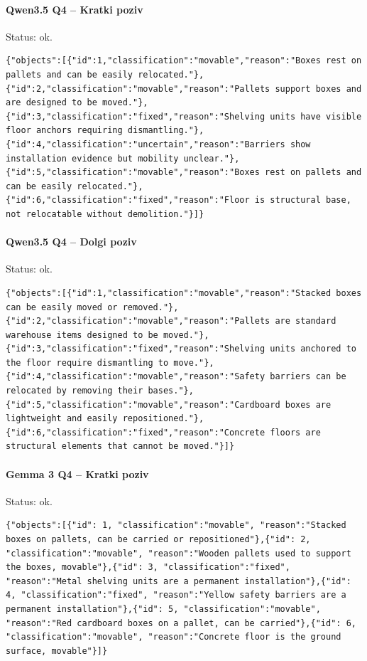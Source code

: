 \paragraph{Qwen3.5 Q4 -- Kratki poziv}
Status: ok. 
\begin{lstlisting}
{"objects":[{"id":1,"classification":"movable","reason":"Boxes rest on pallets and can be easily relocated."},{"id":2,"classification":"movable","reason":"Pallets support boxes and are designed to be moved."},{"id":3,"classification":"fixed","reason":"Shelving units have visible floor anchors requiring dismantling."},{"id":4,"classification":"uncertain","reason":"Barriers show installation evidence but mobility unclear."},{"id":5,"classification":"movable","reason":"Boxes rest on pallets and can be easily relocated."},{"id":6,"classification":"fixed","reason":"Floor is structural base, not relocatable without demolition."}]}
\end{lstlisting}
\paragraph{Qwen3.5 Q4 -- Dolgi poziv}
Status: ok. 
\begin{lstlisting}
{"objects":[{"id":1,"classification":"movable","reason":"Stacked boxes can be easily moved or removed."},{"id":2,"classification":"movable","reason":"Pallets are standard warehouse items designed to be moved."},{"id":3,"classification":"fixed","reason":"Shelving units anchored to the floor require dismantling to move."},{"id":4,"classification":"movable","reason":"Safety barriers can be relocated by removing their bases."},{"id":5,"classification":"movable","reason":"Cardboard boxes are lightweight and easily repositioned."},{"id":6,"classification":"fixed","reason":"Concrete floors are structural elements that cannot be moved."}]}
\end{lstlisting}
\paragraph{Gemma 3 Q4 -- Kratki poziv}
Status: ok. 
\begin{lstlisting}
{"objects":[{"id": 1, "classification":"movable", "reason":"Stacked boxes on pallets, can be carried or repositioned"},{"id": 2, "classification":"movable", "reason":"Wooden pallets used to support the boxes, movable"},{"id": 3, "classification":"fixed", "reason":"Metal shelving units are a permanent installation"},{"id": 4, "classification":"fixed", "reason":"Yellow safety barriers are a permanent installation"},{"id": 5, "classification":"movable", "reason":"Red cardboard boxes on a pallet, can be carried"},{"id": 6, "classification":"movable", "reason":"Concrete floor is the ground surface, movable"}]}
\end{lstlisting}
